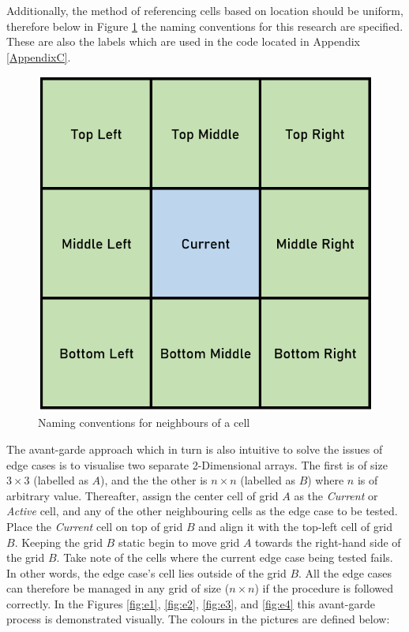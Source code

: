 Additionally, the method of referencing cells based on location should be uniform, therefore below in Figure \ref{fig:labs} the naming conventions for this research are specified. These are also the labels which are used in the code located in Appendix \ref{AppendixC}. 
\begin{figure}[H]
\centering
\includegraphics[scale=0.5]{Figures/Chapter3/labels}
\caption{Naming conventions for neighbours of a cell}
\label{fig:labs}
\end{figure}
The avant-garde approach which in turn is also intuitive to solve the issues of edge cases is to visualise two separate 2-Dimensional arrays. The first is of size $3 \times 3$ (labelled as $A$), and the the other is $n \times n$ (labelled as $B$) where $n$ is of arbitrary value. Thereafter, assign the center cell of grid $A$ as the \textit{Current} or \textit{Active} cell, and any of the other neighbouring cells as the edge case to be tested. Place the \textit{Current} cell on top of grid $B$ and align it with the top-left cell of grid $B$. Keeping the grid $B$ static begin to move grid $A$ towards the right-hand side of the grid $B$. Take note of the cells where the current edge case being tested fails. In other words, the edge case's cell lies outside of the grid $B$. All the edge cases can therefore be managed in any grid of size ($n \times n$) if the procedure is followed correctly. In the Figures \ref{fig:e1}, \ref{fig:e2}, \ref{fig:e3}, and \ref{fig:e4} this avant-garde process is demonstrated visually. The colours in the pictures are defined below:
